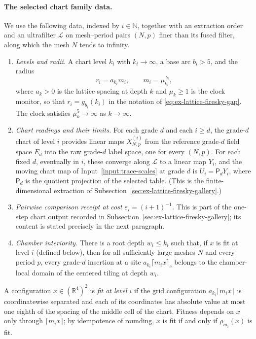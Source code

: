 \paragraph{The selected chart family data.}
We use the following data, indexed by $i\in\mathbb N$, together with an
extraction order and an ultrafilter $\mathcal L$ on mesh--period pairs
$(N,p)$ finer than its fused filter, along which the mesh $N$ tends to
infinity.
\begin{enumerate}
\item[(G1)] \emph{Levels and radii.} A chart level $k_i$ with
 $k_i\to\infty$, a base arc $b_i>5$, and the radius
 \[
  r_i=a_{k_i}m_i,\qquad m_i=\mu_{k_i}^{\,b_i},
 \]
 where $a_k>0$ is the lattice spacing at depth $k$ and $\mu_k\ge1$ is the
 clock monitor, so that $r_i=g_{b_i}(k_i)$ in the notation of
 \eqref{eq:ex-lattice-firesky-gap}. The clock satisfies
 $\mu_k^5\to\infty$ as $k\to\infty$.
\item[(G2)] \emph{Chart readings and their limits.} For each grade $d$
 and each $i\ge d$, the grade-$d$ chart of level $i$ provides linear maps
 $X^{(i)}_{N,p}$ from the reference grade-$d$ field space $E_d$ into the
 raw grade-$d$ label space, one for every $(N,p)$. For each fixed $d$,
 eventually in $i$, these converge along $\mathcal L$ to a linear map
 $Y_{i}$, and the moving chart map of
 Input~\ref{input:trace-scales} at grade $d$ is
 $U_i=\mathsf P_dY_i$, where $\mathsf P_d$ is the quotient projection of
 the selected table. (This is the finite-dimensional extraction of
 Subsection~\ref{sec:ex-lattice-firesky-gallery}.)
\item[(G3)] \emph{Pairwise comparison receipt at cost
 $\varepsilon_i=(i+1)^{-1}$.} This is part of the one-step chart output
 recorded in Subsection~\ref{sec:ex-lattice-firesky-gallery}; its content is
 stated precisely in the next paragraph.
\item[(G4)] \emph{Chamber interiority.} There is a root depth
 $w_i\le k_i$ such that, if $x$ is fit at level $i$ (defined below), then
 for all sufficiently large meshes $N$ and every period $p$, every
 grade-$d$ insertion at a site $a_{k_i}\lceil m_ix\rceil_c$ belongs to the
 chamber-local domain of the centered tiling at depth $w_i$.
\end{enumerate}
A configuration $x\in(\mathbb R^4)^2$ is \emph{fit at level $i$} if the
grid configuration $a_{k_i}\lceil m_ix\rceil$ is coordinatewise
separated and each of its coordinates has absolute value at most one
eighth of the spacing of the middle cell of the chart. Fitness depends on
$x$ only through $\lceil m_ix\rceil$; by idempotence of rounding, $x$ is
fit if and only if $\rho_{m_i}(x)$ is fit.


